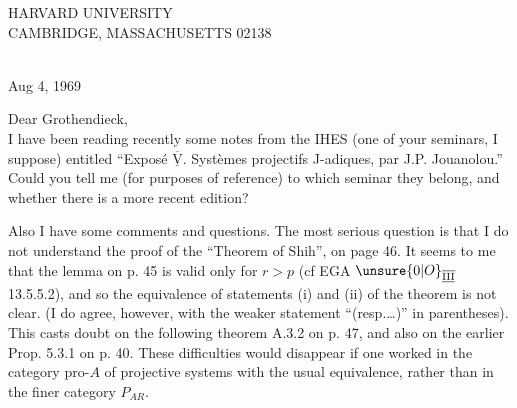 \begin{center}
{\sffamily HARVARD UNIVERSITY\\
CAMBRIDGE, MASSACHUSETTS 02138}
\end{center}
\\
\hfill Aug 4, 1969\\

\noindent Dear Grothendieck,\\

I have been reading recently some notes from the IHES (one of your seminars, I suppose) entitled ``Exposé \(\overline{\underline{\mathrm{V}}}\). Systèmes
\reversemarginpar{}\normalmarginpar%
projectifs J-adiques, par J.P. Jouanolou.'' Could you tell me (for purposes of reference) to which seminar they belong, and whether there is a more recent edition?

Also I have some comments and questions. The most serious question is that I do not understand the proof of the ``Theorem of Shih'',  on page 46. It seems to me that the lemma on p. 45 is valid only for \(r>p\) (cf EGA \(\unsure{0|O}_{\overline{\underline{\mathrm{III}}}}\) 13.5.5.2), and so  the equivalence of statements (i) and (ii) of the theorem is not clear. (I do agree, however, with the weaker statement ``(resp.\ldots)'' in parentheses). This casts doubt on the following theorem A.3.2 on p. 47, and also on the earlier Prop. 5.3.1 on p. 40. These difficulties would disappear if one worked  in the category \(\mathrm{pro}\text{-}A\) \margin{\unsure{:}} of projective systems with the usual equivalence, rather than in the  finer category \(P_{AR}\).

